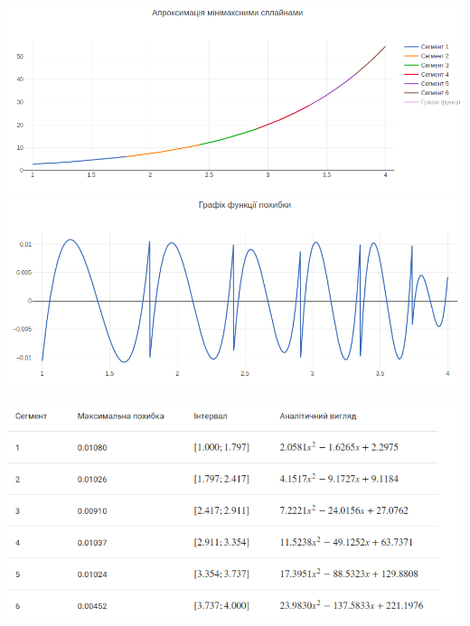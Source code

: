 \documentclass[ukrainian,14pt]{extarticle}
\begin{document}
\includegraphics[scale=0.5]{example3}
\includegraphics[scale=0.5]{example_3_error} \\
\vspace{0.5cm}

\includegraphics[scale=0.7]{example3_table}

\newpage
\end{document}
